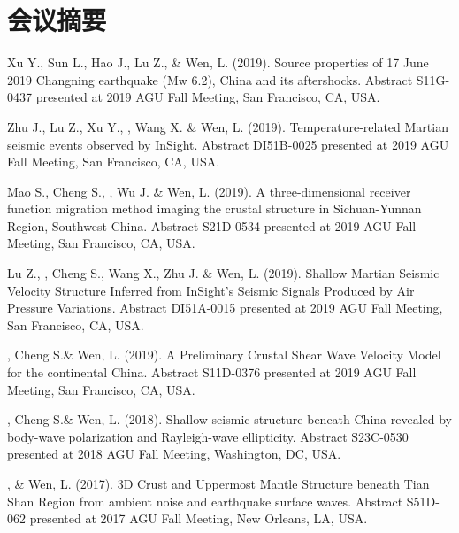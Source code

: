 \section*{会议摘要}
\begin{etaremune}
\item
    Xu Y., Sun L., Hao J., Lu Z., \Xiao \& Wen, L. (2019).
    Source properties of 17 June 2019 Changning earthquake (Mw 6.2), China and its aftershocks.
    Abstract S11G-0437 presented at 2019 AGU Fall Meeting, San Francisco, CA, USA.
\item
    Zhu J., Lu Z., Xu Y., \Xiao, Wang X. \& Wen, L. (2019).
    Temperature-related Martian seismic events observed by InSight.
    Abstract DI51B-0025 presented at 2019 AGU Fall Meeting, San Francisco, CA, USA.
\item
    Mao S., Cheng S., \Xiao, Wu J. \& Wen, L. (2019).
    A three-dimensional receiver function migration method imaging the crustal structure in Sichuan-Yunnan Region, Southwest China. 
    Abstract S21D-0534 presented at 2019 AGU Fall Meeting, San Francisco, CA, USA.
\item
    Lu Z., \Xiao, Cheng S., Wang X., Zhu J. \& Wen, L. (2019).
    Shallow Martian Seismic Velocity Structure Inferred from InSight's Seismic Signals Produced by Air Pressure Variations. 
    Abstract DI51A-0015 presented at 2019 AGU Fall Meeting, San Francisco, CA, USA.
\item
    \Xiao, Cheng S.\& Wen, L. (2019).
    A Preliminary Crustal Shear Wave Velocity Model for the continental China. 
    Abstract S11D-0376 presented at 2019 AGU Fall Meeting, San Francisco, CA, USA.

\item
    \Xiao, Cheng S.\& Wen, L. (2018).
    Shallow seismic structure beneath China revealed by body-wave polarization and Rayleigh-wave ellipticity. 
    Abstract S23C-0530 presented at 2018 AGU Fall Meeting, Washington, DC, USA.
\item
    \Xiao, \& Wen, L. (2017).
    3D Crust and Uppermost Mantle Structure beneath Tian Shan Region from ambient noise and earthquake surface waves. 
    Abstract S51D-062 presented at 2017 AGU Fall Meeting, New Orleans, LA, USA.
\end{etaremune}
